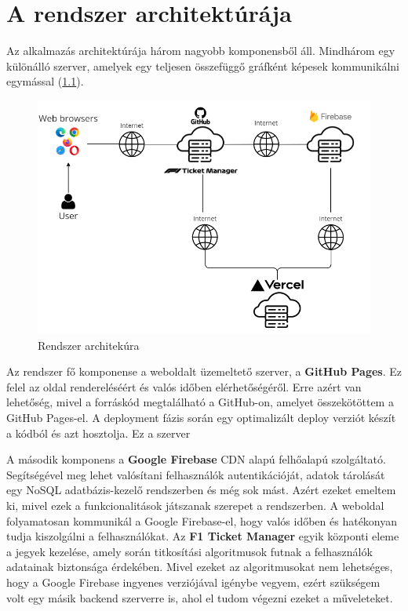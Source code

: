 \chapter{A rendszer architektúrája}

Az alkalmazás architektúrája három nagyobb komponensből áll. Mindhárom egy különálló szerver, amelyek egy teljesen összefüggő gráfként képesek kommunikálni egymással (\ref{abra:architecture}).

\begin{figure}[!h]
	\centering
	\includegraphics[scale=0.7]{images/architecture}
	\caption{Rendszer architekúra}
	\label{abra:architecture}
\end{figure}

Az rendszer fő komponense a weboldalt üzemeltető szerver, a \textbf{GitHub Pages}. Ez felel az oldal rendereléséért és valós időben elérhetőségéről. Erre azért van lehetőség, mivel a forráskód megtalálható a GitHub-on, amelyet összekötöttem a GitHub Pages-el. A deployment fázis során egy optimalizált deploy verziót készít a kódból és azt hosztolja. Ez a szerver 

A második komponens a \textbf{Google Firebase} CDN alapú felhőalapú szolgáltató. Segítségével meg lehet valósítani felhasználók autentikációját, adatok tárolását egy NoSQL adatbázis-kezelő rendszerben és még sok mást. Azért ezeket emeltem ki, mivel ezek a funkcionalitások játszanak szerepet a rendszerben. A weboldal folyamatosan kommunikál a Google Firebase-el, hogy valós időben és hatékonyan tudja kiszolgálni a felhasználókat. Az \textbf{F1 Ticket Manager} egyik központi eleme a jegyek kezelése, amely során titkosítási algoritmusok futnak a felhasználók adatainak biztonsága érdekében. Mivel ezeket az algoritmusokat nem lehetséges, hogy a Google Firebase ingyenes verziójával igénybe vegyem, ezért szükségem volt egy másik backend szerverre is, ahol el tudom végezni ezeket a műveleteket.

